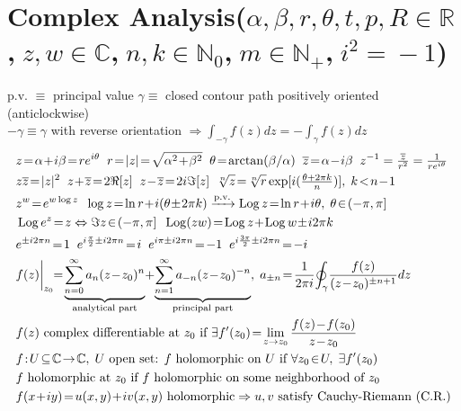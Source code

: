 \section*{Complex Analysis\normalfont\scriptsize{($\alpha,\beta,r,\theta,t,p,R\!\in\!\mathbb{R}$,$\;z,w\!\in\!\mathbb{C}$,$\;n,k\!\in\!\mathbb{N}_0$,$\;m\!\in\!\mathbb{N}_+$,$\;i^2\!=\!-1$)}}
\normalfont\scriptsize{ p.v. $\equiv$\! principal value \; $\gamma \equiv$ closed contour path positively oriented (anticlockwise)}\\
\normalfont\scriptsize{$-\gamma\equiv \gamma$ with reverse orientation $\Rightarrow\int_{-\gamma} f(z)dz= -\int_{\gamma}f(z)dz$}
\begin{align*}
&z\!=\!\alpha\!+\!i\beta\!=\!re^{i\theta}\;\;r\!=\!|z|\!=\!\sqrt{\alpha^2\!+\!\beta^2}\;\;\theta\!=\!\arctan(\beta/\alpha)\;\;\overline{z}\!=\!\alpha\!-\!i\beta \; \; z^{-1}=\tfrac{\overline{z}}{r^{2}} = \tfrac{1}{re^{i\theta}}\\
&z\overline{z}\!=\!|z|^2\;\;z\!+\!\overline{z}\!=\!2\Re[z]\;\;z\!-\!\overline{z}\!=\!2i\Im[z]\;\;\sqrt[n]{z}\!=\!\sqrt[n]{r}\exp[i(\tfrac{\theta+2\pi k}{n})],\;k\!<\!n\!-\!1 \\
&z^w\!=\!e^{w\log z}\;\;\log z\!=\!\ln r\!+\!i(\theta\!\pm\!2\pi k)\xrightarrow{\text{p.v.}}\operatorname{Log}z\!=\!\ln r\!+\!i\theta,\;\theta\!\in\!(-\pi,\pi] \\
&\operatorname{Log}e^z\!=\!z\Leftrightarrow\Im z\!\in\!(-\pi,\pi]\;\;\operatorname{Log}(zw)\!=\!\operatorname{Log}z\!+\!\operatorname{Log}w\!\pm\!i2\pi k \\
&e^{\pm i2\pi n}\!=\!1\;\;e^{i\frac{\pi}{2}\pm i2\pi n}\!=\!i\;\;e^{i\pi\pm i2\pi n}\!=\!-1\;\;e^{i\frac{3\pi}{2}\pm i2\pi n}\!=\!-i \\
&f(z)\bigg|_{z_0}\!\!=\!\underbrace{\sum_{n=0}^\infty a_n(z\!-\!z_0)^n}_{\text{\scriptsize analytical part}}\!+\!\underbrace{\sum_{n=1}^\infty a_{-n}(z\!-\!z_0)^{-n}}_{\text{\scriptsize principal part}},\;a_{\pm n}\!=\!\frac{1}{2\pi i}\!\oint_\gamma\!\frac{f(z)}{(z\!-\!z_0)^{\pm n+1}}dz \\
&\text{$f(z)$ complex differentiable at $z_0$ if }\exists f'(z_0)\!=\!\lim_{z\to z_0}\frac{f(z)\!-\!f(z_0)}{z\!-\!z_0} \\
&f\!:\!U\!\subseteq\!\mathbb{C}\!\to\!\mathbb{C},\;U\text{ open set: $f$ holomorphic on $U$ if }\forall z_0\!\in\!U,\;\exists f'(z_0) \\
&\text{$f$ holomorphic at $z_0$ if $f$ holomorphic on some neighborhood of $z_0$} \\
&f(x\!+\!iy)\!=\!u(x,y)\!+\!iv(x,y)\text{ holomorphic}\Rightarrow u,v\text{ satisfy Cauchy-Riemann (C.R.)} \\

\end{align*}
